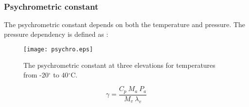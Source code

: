 \subsubsection{Psychrometric constant}
\label{sec:psychro}
The psychrometric constant depends on both the temperature and pressure. 
The pressure dependency is defined as \parencite[Eq. 8]{allen98}:

\begin{figure}[ht!]
    \texttt{[image: psychro.eps]}
    \caption{The psychrometric constant at three elevations for temperatures from -20$^{\circ}$ to 40$^{\circ}$C.}
    \label{fig:psychro}
\end{figure}

\begin{equation}
\label{eq:psychro}
	\gamma = \frac{C_p\: M_a\: P_{a}}{M_v\: \lambda_v}
\end{equation}

